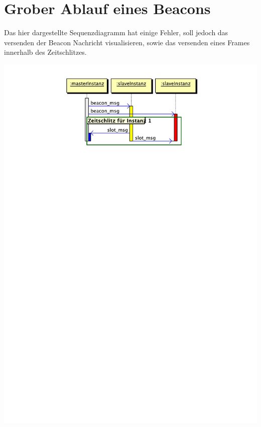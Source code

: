 \documentclass{article}
\begin{document}
\section{Grober Ablauf eines Beacons}
Das hier dargestellte Sequenzdiagramm hat einige Fehler, soll jedoch das versenden der Beacon Nachricht visualisieren, sowie das versenden eines Frames innerhalb des Zeitschlitzes.
\begin{center}
\includegraphics[scale=.75]{Documents/beacon_frame}
\end{center}
\end{document}
